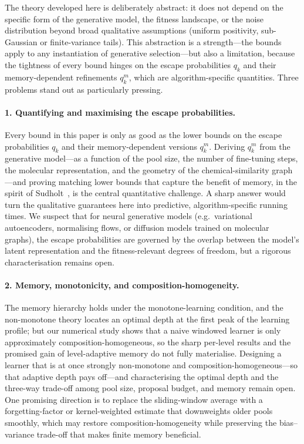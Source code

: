 \documentclass[11pt,a4paper]{article}
\begin{document}
The theory developed here is deliberately abstract: it does not depend on
the specific form of the generative model, the fitness landscape, or the
noise distribution beyond broad qualitative assumptions (uniform
positivity, sub-Gaussian or finite-variance tails).  This abstraction is a
strength---the bounds apply to any instantiation of generative
selection---but also a limitation, because the tightness of every bound
hinges on the escape probabilities $q_k$ and their memory-dependent
refinements $q_k^m$, which are algorithm-specific quantities.  Three
problems stand out as particularly pressing.

\paragraph{1. Quantifying and maximising the escape probabilities.}
Every bound in this paper is only as good as the lower bounds on the escape
probabilities $q_k$ and their memory-dependent versions $q_k^m$.  Deriving
$q_k^m$ from the generative model---as a function of the pool size, the
number of fine-tuning steps, the molecular representation, and the geometry
of the chemical-similarity graph---and proving matching lower bounds that
capture the benefit of memory, in the spirit of Sudholt~\cite{Sudholt2013},
is the central quantitative challenge.  A sharp answer would turn the
qualitative guarantees here into predictive, algorithm-specific running
times.  We suspect that for neural generative models (e.g.\ variational
autoencoders, normalising flows, or diffusion models trained on molecular
graphs), the escape probabilities are governed by the overlap between the
model's latent representation and the fitness-relevant degrees of freedom,
but a rigorous characterisation remains open.

\paragraph{2. Memory, monotonicity, and composition-homogeneity.}
The memory hierarchy holds under the monotone-learning condition, and the
non-monotone theory locates an optimal depth at the first peak of the
learning profile; but our numerical study shows that a naive windowed
learner is only approximately composition-homogeneous, so the sharp
per-level results and the promised gain of level-adaptive memory do not
fully materialise.  Designing a learner that is at once strongly
non-monotone and composition-homogeneous---so that adaptive depth pays
off---and characterising the optimal depth and the three-way trade-off
among pool size, proposal budget, and memory remain open.  One promising
direction is to replace the sliding-window average with a
forgetting-factor or kernel-weighted estimate that downweights older pools
smoothly, which may restore composition-homogeneity while preserving the
bias--variance trade-off that makes finite memory beneficial.
\end{document}
